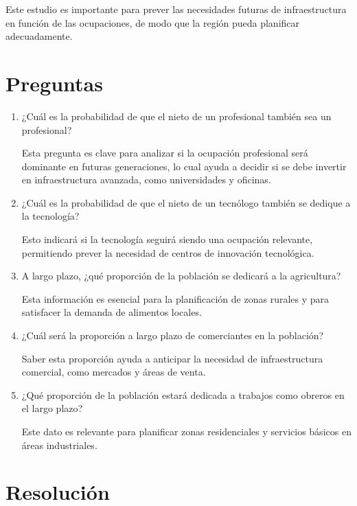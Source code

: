 \documentclass{article}  %
\begin{document}
Este estudio es importante para prever las necesidades futuras de infraestructura en función de las ocupaciones, de modo que la región pueda planificar adecuadamente.

\section*{Preguntas}

\begin{enumerate}
    \item ¿Cuál es la probabilidad de que el nieto de un profesional también sea un profesional?

    Esta pregunta es clave para analizar si la ocupación profesional será dominante en futuras generaciones, lo cual ayuda a decidir si se debe invertir en infraestructura avanzada, como universidades y oficinas.

    \item ¿Cuál es la probabilidad de que el nieto de un tecnólogo también se dedique a la tecnología?

    Esto indicará si la tecnología seguirá siendo una ocupación relevante, permitiendo prever la necesidad de centros de innovación tecnológica.

    \item A largo plazo, ¿qué proporción de la población se dedicará a la agricultura?

    Esta información es esencial para la planificación de zonas rurales y para satisfacer la demanda de alimentos locales.

    \item ¿Cuál será la proporción a largo plazo de comerciantes en la población?

    Saber esta proporción ayuda a anticipar la necesidad de infraestructura comercial, como mercados y áreas de venta.

    \item ¿Qué proporción de la población estará dedicada a trabajos como obreros en el largo plazo?

    Este dato es relevante para planificar zonas residenciales y servicios básicos en áreas industriales.
\end{enumerate}

\newpage

\section*{Resolución}
\end{document}

